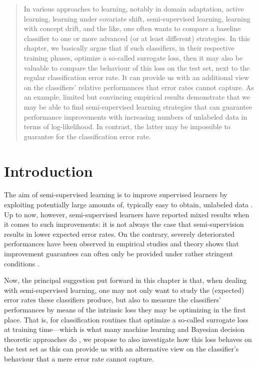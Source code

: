 \documentclass[twoside]{memoir}\usepackage[]{graphicx}\usepackage{xcolor}
\renewcommand{\cite}{\citep}
\begin{document}
\begin{abstract}
In various approaches to learning, notably in domain adaptation, active learning, learning under covariate shift, semi-supervised learning, learning with concept drift, and the like, one often wants to compare a baseline classifier to one or more advanced (or at least different) strategies.  In this chapter, we basically argue that if such classifiers, in their respective training phases, optimize a so-called surrogate loss, then it may also be valuable to compare the behaviour of this loss on the test set, next to the regular classification error rate. It can provide us with an additional view on the classifiers' relative performances that error rates cannot capture.  As an example, limited but convincing empirical results demonstrate that we may be able to find semi-supervised learning strategies that can guarantee performance improvements with increasing numbers of unlabeled data in terms of log-likelihood.  In contrast, the latter may be impossible to guarantee for the classification error rate.
\end{abstract}


\section{Introduction}
The aim of semi-supervised learning is to improve supervised learners by exploiting potentially large amounts of, typically easy to obtain, unlabeled data \cite{Chapelle2006}.  Up to now, however, semi-supervised learners have reported mixed results when it comes to such improvements: it is not always the case that semi-supervision results in lower expected error rates.  On the contrary, severely deteriorated performances have been observed in empirical studies and theory shows that improvement guarantees can often only be provided under rather stringent conditions \cite{Castelli1995,Ben-David2008,Lafferty2007,Singh2008}.

Now, the principal suggestion put forward in this chapter is that, when dealing with semi-supervised learning, one may not only want to study the (expected) error rates these classifiers produce, but also to measure the classifiers' performances by means of the intrinsic loss they may be optimizing in the first place.  That is, for classification routines that optimize a so-called surrogate loss at training time---which is what many machine learning and Bayesian decision theoretic approaches do \cite{scholkopf2002learning,robert2001bayesian}, we propose to also investigate how this loss behaves on the test set as this can provide us with an alternative view on the classifier's behaviour that a mere error rate cannot capture.
\end{document}
